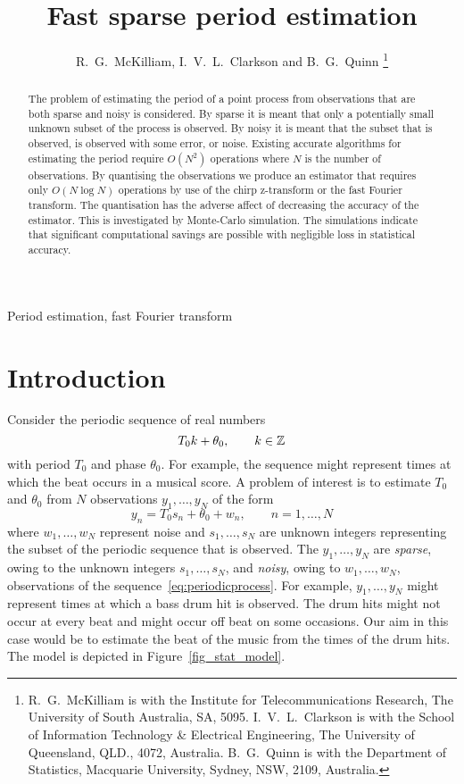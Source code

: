 \documentclass[10pt,twocolumn,twoside]{IEEEtran}
\title{Fast sparse period estimation}
\author{R.~G.~McKilliam, I.~V.~L.~Clarkson and B.~G.~Quinn    
\thanks{
R.~G.~McKilliam is with the Institute for Telecommunications Research, The University of South Australia, SA, 5095.  I.~V.~L.~Clarkson is with the School of Information Technology \& Electrical Engineering, The University of Queensland, QLD., 4072, Australia.  B.~G.~Quinn is with the Department of Statistics, Macquarie University, Sydney, NSW, 2109, Australia.
}}
\begin{document}
\maketitle

\begin{abstract}

The problem of estimating the period of a point process from observations that are both sparse and noisy is considered.  By sparse it is meant that only a potentially small unknown subset of the process is observed.  By noisy it is meant that the subset that is observed, is observed with some error, or noise.  Existing accurate algorithms for estimating the period require $O(N^2)$ operations where $N$ is the number of observations.  By quantising the observations we produce an estimator that requires only $O(N\log N)$ operations by use of the chirp z-transform or the fast Fourier transform.  The quantisation has the adverse affect of decreasing the accuracy of the estimator.  This is investigated by Monte-Carlo simulation.  The simulations indicate that significant computational savings are possible with negligible loss in statistical accuracy.

\end{abstract}
\begin{IEEEkeywords}
Period estimation, fast Fourier transform
\end{IEEEkeywords}

\section{Introduction}

Consider the periodic sequence of real numbers
\begin{equation}\label{eq:periodicprocess}
T_0 k + \theta_0, \qquad k \in {\mathbb Z}
\end{equation}
with period $T_0$ and phase $\theta_0$.  For example, the sequence might represent times at which the beat occurs in a musical score.  A problem of interest is to estimate $T_0$ and $\theta_0$ from $N$ observations $y_1,\dots,y_N$ of the form
\begin{equation} \label{eq:sigmodel}
y_n = T_0 s_n + \theta_0 + w_n, \qquad n = 1,\dots,N
\end{equation}
where $w_1,\dots,w_N$ represent noise and $s_1,\dots,s_N$ are unknown integers representing the subset of the periodic sequence that is observed.  The $y_1, \dots, y_N$ are \emph{sparse}, owing to the unknown integers $s_1,\dots,s_N$, and \emph{noisy}, owing to $w_1,\dots,w_N$, observations of the sequence~\eqref{eq:periodicprocess}.  For example, $y_1,\dots,y_N$ might represent times at which a bass drum hit is observed.  The drum hits might not occur at every beat and might occur off beat on some occasions.  Our aim in this case would be to estimate the beat of the music from the times of the drum hits.  The model is depicted in Figure~\ref{fig_stat_model}. %
\end{document}
